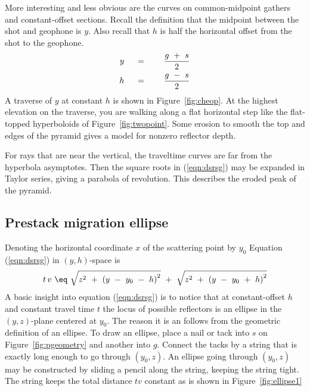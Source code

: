 \par
More interesting and less obvious are the curves
on common-midpoint gathers and constant-offset sections.
Recall the definition that the midpoint between the shot and geophone is  $y$.
Also recall that  $h$  is half the horizontal offset
from the shot to the geophone.
\begin{eqnarray}
y\ \ \ \ &=&\ \ \ \ {g \ +\  s  \over 2 }
\label{eqn:2.5a}
\\
h\ \ \ \ &=&\ \ \ \ {g \ -\  s  \over 2 }
\label{eqn:2.5b}
\end{eqnarray}
A traverse
of $y$ at constant $h$ is shown in Figure~\ref{fig:cheop}.
At the highest elevation on the traverse,
you are walking along a flat horizontal
step like the flat-topped hyperboloids of Figure~\ref{fig:twopoint}.
Some erosion to smooth the top and edges of the pyramid
gives a model for nonzero reflector depth.
\par
For rays that are near the vertical,
the traveltime curves are far from the hyperbola asymptotes.
Then the square roots in (\ref{eqn:dsrsg}) may be expanded in Taylor series,
giving a parabola of revolution.
This describes the eroded peak of the pyramid.

\subsection{Prestack migration ellipse}

Denoting the horizontal coordinate $x$ of the scattering point by $y_0$
Equation (\ref{eqn:dsrsg}) in $(y,h)$-space is
\begin{equation}
t\,v\  \eq \  \sqrt { z^2\ +\ {( y \ -\  y_0  \  - \  h) }^2}  
     \ +\  \sqrt { z^2\ +\ {( y \ -\  y_0   \ + \  h) }^2} 
\label{eqn:dsryh}
\end{equation}
A basic insight into equation (\ref{eqn:dsrsg}) is to notice
that at constant-offset  $h$  and constant travel time  $t$
the locus of possible reflectors is
an ellipse in the $(y ,z)$-plane centered at $y_0$.
The reason it is an 
follows from the geometric definition of an ellipse.
To draw an ellipse,
place a nail or tack into $s$ on Figure~\ref{fig:pgeometry}
and another into $g$.
Connect the tacks by a string
that is exactly long enough to go through  $(y_0 ,z)$.
An ellipse going through  $(y_0 ,z)$  may be constructed
by sliding a pencil along the string,
keeping the string tight.
The string keeps the total distance  $tv$  constant as is shown in
Figure~\ref{fig:ellipse1}
\newslide
\par


